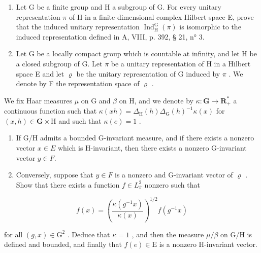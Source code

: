 \begin{enumerate}
\def\labelenumi{\arabic{enumi})}
\setcounter{enumi}{18}
\item
  Let G be a finite group and H a subgroup of G. For every unitary representation \(\pi\) of H in a finite-dimensional complex Hilbert space E, prove that the induced unitary representation \(\operatorname{Ind}_{\mathrm{H}}^{\mathrm{G}}(\pi)\) is isomorphic to the induced representation defined in A, VIII, p. 392, § 21, n° 3.
\item
  Let G be a locally compact group which is countable at infinity, and let H be a closed subgroup of G. Let \(\pi\) be a unitary representation of H in a Hilbert space E and let \(\varrho\) be the unitary representation of G induced by \(\pi\) . We denote by F the representation space of \(\varrho\) .
\end{enumerate}

We fix Haar measures \(\mu\) on G and \(\beta\) on H, and we denote by \(\kappa\colon\mathbf{G}\to\mathbf{R}_{+}^{*}\) a continuous function such that \(\kappa(xh)=\Delta_{\mathrm{H}}(h)\Delta_{\mathrm{G}}(h)^{-1}\kappa(x)\) for \((x,h)\in\mathbf{G}\times\mathrm{H}\) and such that \(\kappa(e)=1\) .

\begin{enumerate}
\def\labelenumi{\alph{enumi})}
\item
  If G/H admits a bounded G-invariant measure, and if there exists a nonzero vector \(x \in E\) which is H-invariant, then there exists a nonzero G-invariant vector \(y \in F\).
\item
  Conversely, suppose that \(y \in F\) is a nonzero and G-invariant vector of \(\varrho\) . Show that there exists a function \(f \in L_{\overline{\pi}}^{2}\) nonzero such that
\end{enumerate}

\[
f (x) = \left(\frac {\kappa (g ^ {- 1} x)}{\kappa (x)}\right) ^ {1 / 2} f (g ^ {- 1} x)
\]

for all \((g, x) \in \mathrm{G}^{2}\) . Deduce that \(\kappa = 1\) , and then the measure \(\mu/\beta\) on G/H is defined and bounded, and finally that \(f(e) \in \mathrm{E}\) is a nonzero H-invariant vector.
\relax{}
